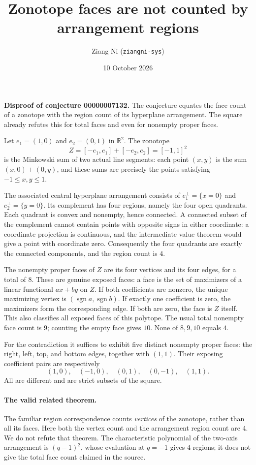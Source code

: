 \documentclass[11pt]{article}
\title{Zonotope faces are not counted by arrangement regions}
\author{Ziang Ni (\texttt{ziangni-sys})}
\date{10 October 2026}
\begin{document}
\maketitle
\noindent\textbf{Disproof of conjecture 00000007132.}
The conjecture equates the face count of a zonotope with the region
count of its hyperplane arrangement. The square already refutes this
for total faces and even for nonempty proper faces.

Let $e_1=(1,0)$ and $e_2=(0,1)$ in $\mathbb R^2$. The zonotope
\[
 Z=[-e_1,e_1]+[-e_2,e_2]=[-1,1]^2
\]
is the Minkowski sum of two actual line segments: each point $(x,y)$
is the sum $(x,0)+(0,y)$, and these sums are precisely the points
satisfying $-1\leq x,y\leq1$.

The associated central hyperplane arrangement consists of
$e_1^\perp=\{x=0\}$ and $e_2^\perp=\{y=0\}$. Its complement has four
regions, namely the four open quadrants. Each quadrant is convex and
nonempty, hence connected. A connected subset of the complement
cannot contain points with opposite signs in either coordinate:
a coordinate projection is continuous, and the intermediate value
theorem would give a point with coordinate zero. Consequently the
four quadrants are exactly the connected components, and the region
count is $4$.

The nonempty proper faces of $Z$ are its four vertices and its four
edges, for a total of $8$. These are genuine exposed faces: a face is
the set of maximizers of a linear functional $ax+by$ on $Z$.
If both coefficients are nonzero, the unique maximizing vertex is
$(\operatorname{sgn}a,\operatorname{sgn}b)$. If exactly one coefficient
is zero, the maximizers form the corresponding edge. If both are
zero, the face is $Z$ itself. This also classifies all exposed faces
of this polytope. The usual total nonempty face count is $9$; counting
the empty face gives $10$. None of $8,9,10$ equals $4$.

For the contradiction it suffices to exhibit five distinct nonempty
proper faces: the right, left, top, and bottom edges, together with
$(1,1)$. Their exposing coefficient pairs are respectively
\[
 (1,0),\quad(-1,0),\quad(0,1),\quad(0,-1),\quad(1,1).
\]
All are different and are strict subsets of the square.

\paragraph{The valid related theorem.}
The familiar region correspondence counts \emph{vertices} of the
zonotope, rather than all its faces. Here both the vertex count and
the arrangement region count are $4$. We do not refute that theorem.
The characteristic polynomial of the two-axis arrangement is
$(q-1)^2$, whose evaluation at $q=-1$ gives $4$ regions; it does not
give the total face count claimed in the source.
\end{document}
